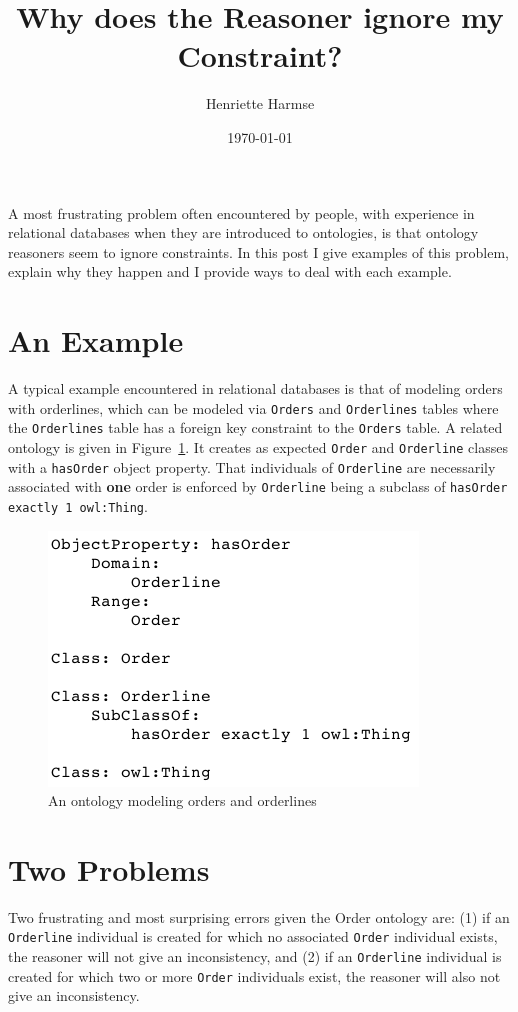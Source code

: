\documentclass{amsart}
\title{Why does the Reasoner ignore my Constraint?}
\author{Henriette Harmse}
\date{\today}
\begin{document}
  \maketitle
  
  
  A most frustrating problem often encountered by people, with experience in relational databases when they are introduced to ontologies, is that ontology reasoners seem to ignore constraints. In this post I give examples of this problem, explain why they happen and I provide ways to deal with each example. 
  
  \section{An Example}
  A typical example encountered in relational databases is that of modeling orders with orderlines, which can be modeled via \texttt{Orders} and \texttt{Orderlines} tables where the \texttt{Orderlines} table has a foreign key constraint to the \texttt{Orders} table. A related ontology is given in Figure~\ref{f_Order}. It creates as expected \texttt{Order} and \texttt{Orderline} classes with a \texttt{hasOrder} object property. That individuals of \texttt{Orderline} are necessarily associated with \textbf{one} order is enforced by \texttt{Orderline} being a subclass of \texttt{hasOrder exactly 1 owl:Thing}. 
  
    \begin{figure}
      \centering \includegraphics[trim = 0mm 0mm 0mm 0mm, clip, scale=0.5]{./Order.png}
      \vspace{-3mm}
      \caption{An ontology modeling orders and orderlines}\label{f_Order}
    \end{figure}
    
  \section{Two Problems}
  Two frustrating and most surprising errors given the Order ontology are: (1) if an \texttt{Orderline} individual is created for which no associated \texttt{Order} individual exists, the reasoner will not give an inconsistency, and (2) if an \texttt{Orderline} individual is created for which two or more \texttt{Order} individuals exist, the reasoner will also not give an inconsistency.
  
\end{document}
